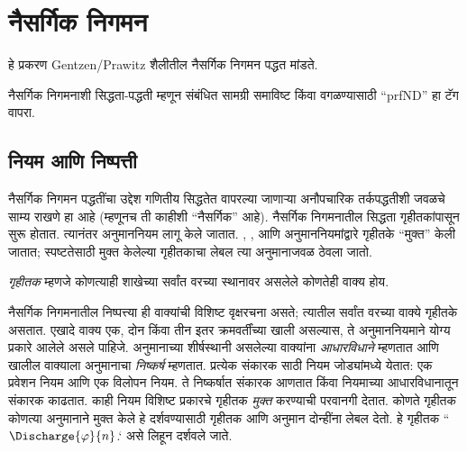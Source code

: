 \chapter{नैसर्गिक निगमन}\label{fol:ntd::chap}
\begin{editorial}
हे प्रकरण Gentzen/Prawitz शैलीतील नैसर्गिक निगमन पद्धत मांडते.

नैसर्गिक निगमनाशी सिद्धता-पद्धती म्हणून संबंधित सामग्री समाविष्ट किंवा
वगळण्यासाठी ``prfND'' हा टॅग वापरा.
\end{editorial}






\section{नियम आणि निष्पत्ती}\label{fol:ntd:rul:sec}

\begin{explain}
नैसर्गिक निगमन पद्धतींचा उद्देश गणितीय सिद्धतेत वापरल्या जाणाऱ्या अनौपचारिक
तर्कपद्धतीशी जवळचे साम्य राखणे हा आहे (म्हणूनच ती काहीशी ``नैसर्गिक'' आहे).
नैसर्गिक निगमनातील सिद्धता गृहीतकांपासून सुरू होतात.
त्यानंतर अनुमाननियम लागू केले जातात. \Intro{\lnot}, \Intro{\lif},
\Elim{\lor} आणि \Elim{\lexists} अनुमाननियमांद्वारे
गृहीतके ``मुक्त'' केली जातात; स्पष्टतेसाठी मुक्त केलेल्या
गृहीतकाचा लेबल त्या अनुमानाजवळ ठेवला जातो.
\end{explain}

\begin{defn}[गृहीतक]
\emph{गृहीतक} म्हणजे कोणत्याही शाखेच्या सर्वांत वरच्या स्थानावर असलेले
कोणतेही वाक्य होय.
\end{defn}

नैसर्गिक निगमनातील निष्पत्त्या ही वाक्यांची विशिष्ट वृक्षरचना असते;
त्यातील सर्वांत वरच्या वाक्ये गृहीतके असतात. एखादे वाक्य एक,
दोन किंवा तीन इतर क्रमवर्तींच्या खाली असल्यास, ते अनुमाननियमाने योग्य
प्रकारे आलेले असले पाहिजे. अनुमानाच्या शीर्षस्थानी असलेल्या वाक्यांना
\emph{आधारविधाने} म्हणतात आणि खालील वाक्याला अनुमानाचा
\emph{निष्कर्ष} म्हणतात. प्रत्येक संकारक साठी नियम जोड्यांमध्ये येतात:
एक प्रवेशन नियम आणि एक विलोपन नियम. ते निष्कर्षात संकारक आणतात
किंवा नियमाच्या आधारविधानातून संकारक काढतात. काही नियम विशिष्ट
प्रकारचे गृहीतक \emph{मुक्त} करण्याची परवानगी देतात. कोणते
गृहीतक कोणत्या अनुमानाने मुक्त केले हे दर्शवण्यासाठी गृहीतक आणि
अनुमान दोन्हींना लेबल देतो. हे गृहीतक ``$\Discharge{\varphi}{n}$.` असे लिहून दर्शवले जाते.


